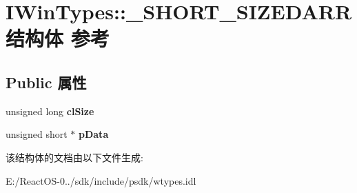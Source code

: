 \hypertarget{struct_i_win_types_1_1___s_h_o_r_t___s_i_z_e_d_a_r_r}{}\section{I\+Win\+Types\+:\+:\+\_\+\+S\+H\+O\+R\+T\+\_\+\+S\+I\+Z\+E\+D\+A\+R\+R结构体 参考}
\label{struct_i_win_types_1_1___s_h_o_r_t___s_i_z_e_d_a_r_r}
\subsection*{Public 属性}
\begin{DoxyCompactItemize}
\item 
\mbox{\label{struct_i_win_types_1_1___s_h_o_r_t___s_i_z_e_d_a_r_r_a266138b621899b3a9eb9a3459df9f5e3}} 
unsigned long {\bfseries cl\+Size}
\item 
\mbox{\label{struct_i_win_types_1_1___s_h_o_r_t___s_i_z_e_d_a_r_r_ad8beda974ab2bee3d510b68cfcf84785}} 
unsigned short $\ast$ {\bfseries p\+Data}
\end{DoxyCompactItemize}


该结构体的文档由以下文件生成\+:\begin{DoxyCompactItemize}
\item 
E\+:/\+React\+O\+S-\/0../sdk/include/psdk/wtypes.\+idl\end{DoxyCompactItemize}
